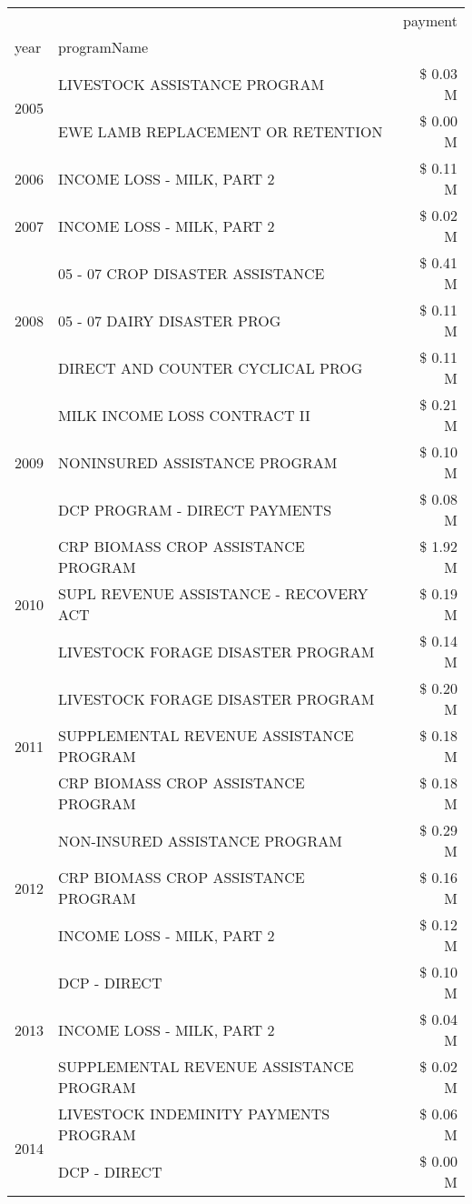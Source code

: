 \begin{tabular}{llr}
\toprule
 &  & payment \\
year & programName &  \\
\midrule
\multirow[t]{2}{*}{2005} & LIVESTOCK ASSISTANCE PROGRAM & \$ 0.03 M \\
 & EWE LAMB REPLACEMENT OR RETENTION & \$ 0.00 M \\
\cline{1-3}
2006 & INCOME LOSS - MILK, PART 2 & \$ 0.11 M \\
\cline{1-3}
2007 & INCOME LOSS - MILK, PART 2 & \$ 0.02 M \\
\cline{1-3}
\multirow[t]{3}{*}{2008} & 05 - 07 CROP DISASTER ASSISTANCE & \$ 0.41 M \\
 & 05 - 07 DAIRY DISASTER PROG & \$ 0.11 M \\
 & DIRECT AND COUNTER CYCLICAL PROG & \$ 0.11 M \\
\cline{1-3}
\multirow[t]{3}{*}{2009} & MILK INCOME LOSS CONTRACT II & \$ 0.21 M \\
 & NONINSURED ASSISTANCE PROGRAM & \$ 0.10 M \\
 & DCP PROGRAM - DIRECT PAYMENTS & \$ 0.08 M \\
\cline{1-3}
\multirow[t]{3}{*}{2010} & CRP BIOMASS CROP ASSISTANCE PROGRAM & \$ 1.92 M \\
 & SUPL REVENUE ASSISTANCE - RECOVERY ACT & \$ 0.19 M \\
 & LIVESTOCK FORAGE DISASTER PROGRAM & \$ 0.14 M \\
\cline{1-3}
\multirow[t]{3}{*}{2011} & LIVESTOCK FORAGE DISASTER PROGRAM & \$ 0.20 M \\
 & SUPPLEMENTAL REVENUE ASSISTANCE PROGRAM & \$ 0.18 M \\
 & CRP BIOMASS CROP ASSISTANCE PROGRAM & \$ 0.18 M \\
\cline{1-3}
\multirow[t]{3}{*}{2012} & NON-INSURED ASSISTANCE PROGRAM & \$ 0.29 M \\
 & CRP BIOMASS CROP ASSISTANCE PROGRAM & \$ 0.16 M \\
 & INCOME LOSS - MILK, PART 2 & \$ 0.12 M \\
\cline{1-3}
\multirow[t]{3}{*}{2013} & DCP - DIRECT & \$ 0.10 M \\
 & INCOME LOSS - MILK, PART 2 & \$ 0.04 M \\
 & SUPPLEMENTAL REVENUE ASSISTANCE PROGRAM & \$ 0.02 M \\
\cline{1-3}
\multirow[t]{3}{*}{2014} & LIVESTOCK INDEMINITY PAYMENTS PROGRAM & \$ 0.06 M \\
 & DCP - DIRECT & \$ 0.00 M \\

\end{tabular}
